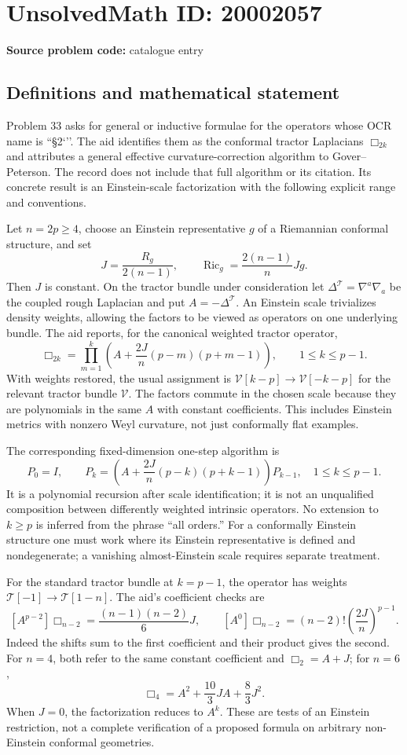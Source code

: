 \documentclass[11pt]{article}
\begin{document}
\section*{UnsolvedMath ID: 20002057}
\textbf{Source problem code:} catalogue entry
\subsection{Definitions and mathematical statement}
Problem 33 asks for general or inductive formulae for the operators whose OCR name is ``§2`''. The aid identifies them as the conformal tractor Laplacians \(\Box_{2k}\) and attributes a general effective curvature-correction algorithm to Gover--Peterson. The record does not include that full algorithm or its citation. Its concrete result is an Einstein-scale factorization with the following explicit range and conventions.

Let \(n=2p\geq4\), choose an Einstein representative \(g\) of a Riemannian conformal structure, and set
\[
 J=\frac{R_g}{2(n-1)},\qquad
 \operatorname{Ric}_g=\frac{2(n-1)}nJg.
\]
Then \(J\) is constant. On the tractor bundle under consideration let \(\Delta^{\mathcal T}=\nabla^a\nabla_a\) be the coupled rough Laplacian and put \(A=-\Delta^{\mathcal T}\). An Einstein scale trivializes density weights, allowing the factors to be viewed as operators on one underlying bundle. The aid reports, for the canonical weighted tractor operator,
\[
 \Box_{2k}=\prod_{m=1}^k
 \left(A+\frac{2J}{n}(p-m)(p+m-1)\right),
 \qquad1\leq k\leq p-1.
\]
With weights restored, the usual assignment is
\(\mathcal V[k-p]\to\mathcal V[-k-p]\) for the relevant tractor bundle \(\mathcal V\). The factors commute in the chosen scale because they are polynomials in the same \(A\) with constant coefficients. This includes Einstein metrics with nonzero Weyl curvature, not just conformally flat examples.

The corresponding fixed-dimension one-step algorithm is
\[
 P_0=I,\qquad
 P_k=\left(A+\frac{2J}{n}(p-k)(p+k-1)\right)P_{k-1},
 \quad1\leq k\leq p-1.
\]
It is a polynomial recursion after scale identification; it is not an unqualified composition between differently weighted intrinsic operators. No extension to \(k\geq p\) is inferred from the phrase ``all orders.'' For a conformally Einstein structure one must work where its Einstein representative is defined and nondegenerate; a vanishing almost-Einstein scale requires separate treatment.

For the standard tractor bundle at \(k=p-1\), the operator has weights
\(\mathcal T[-1]\to\mathcal T[1-n]\). The aid's coefficient checks are
\[
 [A^{p-2}]\Box_{n-2}=\frac{(n-1)(n-2)}6J,
 \qquad
 [A^0]\Box_{n-2}=(n-2)!\left(\frac{2J}{n}\right)^{p-1}.
\]
Indeed the shifts sum to the first coefficient and their product gives the second. For \(n=4\), both refer to the same constant coefficient and \(\Box_2=A+J\); for \(n=6\),
\[
 \Box_4=A^2+\frac{10}{3}JA+\frac83J^2.
\]
When \(J=0\), the factorization reduces to \(A^k\). These are tests of an Einstein restriction, not a complete verification of a proposed formula on arbitrary non-Einstein conformal geometries.
\end{document}
